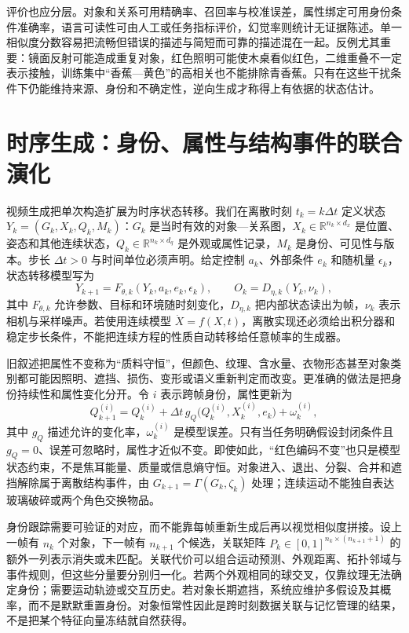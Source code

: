 评价也应分层。对象和关系可用精确率、召回率与校准误差，属性绑定可用身份条件准确率，语言可读性可由人工或任务指标评价，幻觉率则统计无证据陈述。单一相似度分数容易把流畅但错误的描述与简短而可靠的描述混在一起。反例尤其重要：镜面反射可能造成重复对象，红色照明可能使木桌看似红色，二维重叠不一定表示接触，训练集中“香蕉—黄色”的高相关也不能排除青香蕉。只有在这些干扰条件下仍能维持来源、身份和不确定性，逆向生成才称得上有依据的状态估计。

\section{时序生成：身份、属性与结构事件的联合演化}
\label{sec:video_generation}

视频生成把单次构造扩展为时序状态转移。我们在离散时刻 $t_k=k\Delta t$ 定义状态 $Y_k=(G_k,X_k,Q_k,M_k)$：$G_k$ 是当时有效的对象—关系图，$X_k\in\mathbb R^{n_k\times d_x}$ 是位置、姿态和其他连续状态，$Q_k\in\mathbb R^{n_k\times d_q}$ 是外观或属性记录，$M_k$ 是身份、可见性与版本。步长 $\Delta t>0$ 与时间单位必须声明。给定控制 $a_k$、外部条件 $e_k$ 和随机量 $\epsilon_k$，状态转移模型写为
\begin{equation}
  Y_{k+1}=F_{\theta,k}(Y_k,a_k,e_k,\epsilon_k),\qquad
  O_k=D_{\eta,k}(Y_k,\nu_k),
\end{equation}
其中 $F_{\theta,k}$ 允许参数、目标和环境随时刻变化，$D_{\eta,k}$ 把内部状态读出为帧，$\nu_k$ 表示相机与采样噪声。若使用连续模型 $\dot X=f(X,t)$，离散实现还必须给出积分器和稳定步长条件，不能把连续方程的性质自动转移给任意帧率的生成器。

旧叙述把属性不变称为“质料守恒”，但颜色、纹理、含水量、衣物形态甚至对象类别都可能因照明、遮挡、损伤、变形或语义重新判定而改变。更准确的做法是把身份持续性和属性变化分开。令 $i$ 表示跨帧身份，属性更新为
\begin{equation}
  Q_{k+1}^{(i)}=Q_k^{(i)}+\Delta t\,g_Q
  \bigl(Q_k^{(i)},X_k^{(i)},e_k\bigr)+\omega_k^{(i)},
\end{equation}
其中 $g_Q$ 描述允许的变化率，$\omega_k^{(i)}$ 是模型误差。只有当任务明确假设封闭条件且 $g_Q=0$、误差可忽略时，属性才近似不变。即使如此，“红色编码不变”也只是模型状态约束，不是焦耳能量、质量或信息熵守恒。对象进入、退出、分裂、合并和遮挡解除属于离散结构事件，由 $G_{k+1}=\Gamma(G_k,\zeta_k)$ 处理；连续运动不能独自表达玻璃破碎或两个角色交换物品。

身份跟踪需要可验证的对应，而不能靠每帧重新生成后再以视觉相似度拼接。设上一帧有 $n_k$ 个对象，下一帧有 $n_{k+1}$ 个候选，关联矩阵 $P_k\in[0,1]^{n_k\times(n_{k+1}+1)}$ 的额外一列表示消失或未匹配。关联代价可以组合运动预测、外观距离、拓扑邻域与事件规则，但这些分量要分别归一化。若两个外观相同的球交叉，仅靠纹理无法确定身份；需要运动轨迹或交互历史。若对象长期遮挡，系统应维护多假设及其概率，而不是默默重置身份。对象恒常性因此是跨时刻数据关联与记忆管理的结果，不是把某个特征向量冻结就自然获得。

